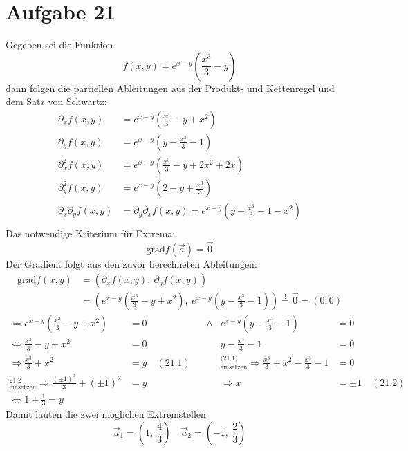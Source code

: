 \documentclass[10pt]{article}
\begin{document}
\thispagestyle{fancy}

\section*{Aufgabe 21}
Gegeben sei die Funktion 
\[
	f(x,y) = e^{x-y} \left(\frac{x^3}{3} - y\right)
\]
dann folgen die partiellen Ableitungen aus der Produkt- und Kettenregel und
dem Satz von Schwartz:
\begin{align*}
	\partial_x f(x,y) 
	&= e^{x-y} \left(\frac{x^3}{3} - y + x^2 \right) \\
	\partial_y f(x,y) 
	&= e^{x-y} \left( y - \frac{x^3}3 - 1\right) \\
	\partial^2_x f(x,y) 
	&= e^{x-y} \left(\frac{x^3}{3} - y + 2x^2 + 2x\right) \\
	\partial^2_y f(x,y) 
	&= e^{x-y} \left(2 -y + \frac{x^3}3 \right) \\
	\partial_x\partial_y f(x,y) &= 
	\partial_y\partial_x f(x,y)
	= e^{x-y} \left( y - \frac{x^3}3 - 1 - x^2\right) \\
\end{align*}
Das notwendige Kriterium für Extrema:
\[ \text{grad} f(\vec a) = \vec 0 \]
Der Gradient folgt aus den zuvor berechneten Ableitungen:
\begin{align*}
	\text{grad} f(x,y) 
	&= \left( \partial_x f(x,y), \ \partial_y f(x,y) \right) \\
	&= \left( e^{x-y} \left(\frac{x^3}{3} - y + x^2 \right), \
		e^{x-y} \left( y - \frac{x^3}3 - 1\right) \right) 
	\overset != \vec 0 = (0,0)
\end{align*}
\begin{align*}
	\Leftrightarrow
	e^{x-y} \left(\frac{x^3}{3} - y + x^2 \right) &= 0 
	&
	& \land
	&e^{x-y} \left( y - \frac{x^3}3 - 1\right) &= 0 \\
	\Leftrightarrow
	\frac{x^3}{3} - y + x^2 &= 0 
	& &&
	y - \frac{x^3}3 - 1 &= 0 \\
	\Rightarrow
	\frac{x^3}{3} + x^2 &= y \quad (21.1)
	& &&
	^\text{(21.1)}_\text{einsetzen} \Rightarrow
	\frac{x^3}{3} + x^2 - \frac{x^3}3 - 1 &= 0 \\
	^\text{21.2}_\text{einsetzen} \Rightarrow
	\frac{(\pm 1)^3}{3} + (\pm 1)^2 &= y
	&&&
	\Rightarrow x &= \pm 1 \quad (21.2) \\
	\Leftrightarrow 
	1 \pm \frac13 = y
\end{align*}
Damit lauten die zwei möglichen Extremstellen
\[
	\vec a_1 = \left( 1, \ \frac 43 \right) \quad
	\vec a_2 = \left( -1, \ \frac 23 \right)
\]
\end{document}
